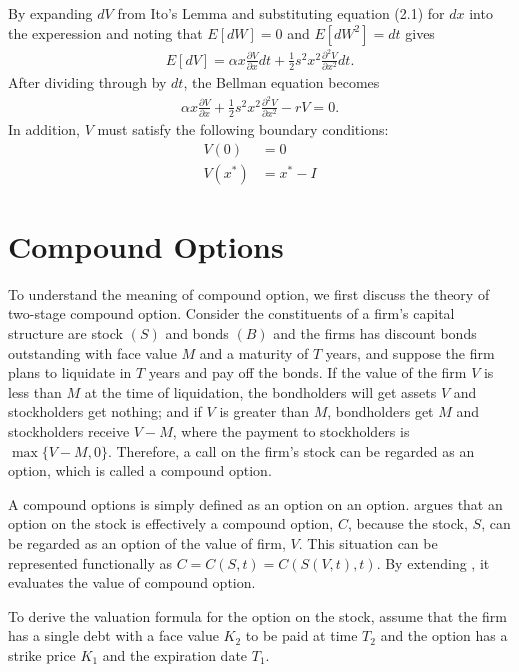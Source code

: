 \documentclass[11pt,letter]{article}
\def\a{\alpha} \def\b{\beta} \def\g{\gamma} \def\d{\delta} \def\r{\rho}
\theoremstyle{definition}
\theoremstyle{remark}
\numberwithin{equation}{section}
\begin{document}
By expanding $dV$ from Ito's Lemma and substituting equation (2.1) for $dx$ into the experession and noting that $E[dW]=0$ and $E[dW^2]=dt$ gives
\begin{align*}
    E[dV]=\a x \frac{\partial V}{\partial x}dt+\frac{1}{2}s^2x^2\frac{\partial^2 V}{\partial x^2}dt.
\end{align*}
After dividing through by $dt$, the Bellman equation becomes
\begin{align}
    \a x \frac{\partial V}{\partial x}+\frac{1}{2}s^2x^2\frac{\partial^2 V}{\partial x^2}-rV=0.
\end{align}
In addition, $V$ must satisfy the following boundary conditions:
\begin{align}
    V(0)&=0\\
    V(x^*)&=x^*-I
\end{align}


\section{Compound Options}
To understand the meaning of compound option, we first discuss the theory of two-stage compound option. Consider the constituents of a firm’s capital structure are stock $(S)$ and bonds $(B)$ and the firms has discount bonds outstanding with face value $M$ and a maturity of $T$ years, and suppose the firm plans to liquidate in $T$ years and pay off the bonds. If the value of the firm $V$ is less than $M$ at the time of liquidation, the bondholders will get assets $V$ and stockholders get nothing; and if $V$ is greater than $M$, bondholders get $M$ and stockholders receive $V-M$, where the payment to stockholders is $\max\{V-M,0\}$. Therefore, a call on the firm's stock can be regarded as an option, which is called a compound option.

A compound options is simply defined as an option on an option. \cite{geske1979valuation} argues that an option on the stock is effectively a compound option, $C$, because the stock, $S$, can be regarded as an option of the value of firm, $V$. This situation can be represented functionally as $C=C(S,t)=C(S(V,t),t)$. By extending \cite{black1973pricing}, it evaluates the value of compound option. 

To derive the valuation formula for the option on the stock, assume that the firm has a single debt with a face value $K_2$ to be paid at time $T_2$ and the option has a strike price $K_1$ and the expiration date $T_1$.
\end{document}
